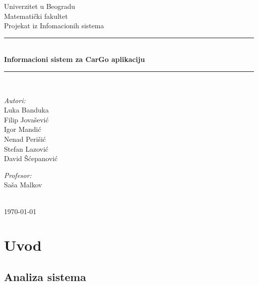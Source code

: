 \documentclass{article}
\begin{document}
\begin{titlepage}

\newcommand{\HRule}{\rule{\linewidth}{0.5mm}}
\center
\textup{\Large Univerzitet u Beogradu\\Matemati\v cki fakultet}\\[1.5cm]
\textup{\Large Projekat iz Infomacionih sistema}\\[0.4cm]

\HRule \\[0.4cm]
{ \huge \bfseries Informacioni sistem za CarGo aplikaciju}\\[0.4cm]
\HRule \\[8.5cm]

\begin{minipage}{0.4\textwidth}
\begin{flushleft}
\large
\emph{Autori:}\\
\textup Luka Banduka\\
\textup Filip Jova\v sevi\' c\\
\textup Igor Mandi\' c\\
\textup Nenad Peri\v si\' c\\
\textup Stefan Lazovi\' c\\
\textup David \v S\' cepanovi\' c

\end{flushleft}
\end{minipage}
\hfill
\begin{minipage}{0.4\textwidth}
\begin{flushright}
\large
\emph{Profesor:} \\
\textup Sa\v sa Malkov\\
\end{flushright}
\end{minipage}\\[2cm]


{\textup \large \today}\\[1cm]

\end{titlepage}

\newpage
\tableofcontents

\newpage
\section{\bfseries Uvod}


\subsection{\bfseries Analiza sistema}
     
\end{document}
